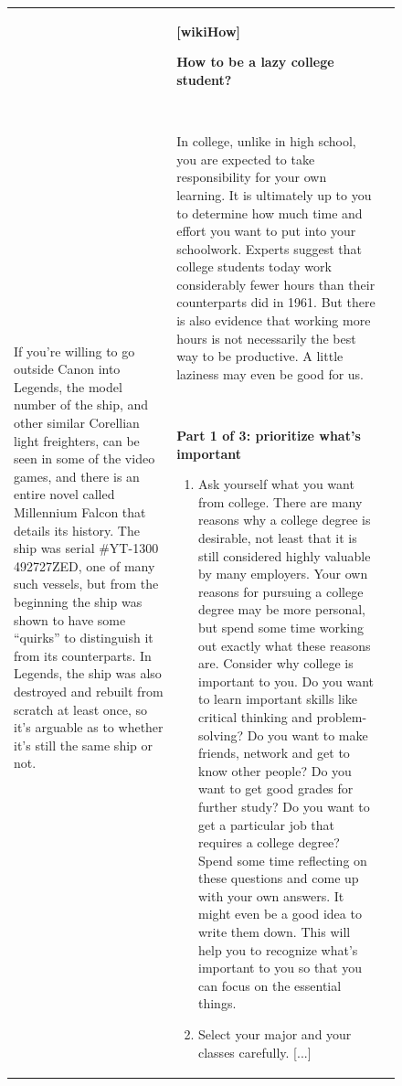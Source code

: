 \begin{figure}[p]
\begin{tabular}{@{}p{}p{}p{}@{}}
    ~
    
    If you're willing to go outside Canon into Legends, the model number of the ship, and other similar Corellian light freighters, can be seen in some of the video games, and there is an entire novel called Millennium Falcon that details its history. The ship was serial \#YT-1300 492727ZED, one of many such vessels, but from the beginning the ship was shown to have some ``quirks'' to distinguish it from its counterparts. In Legends, the ship was also destroyed and rebuilt from scratch at least once, so it's arguable as to whether it's still the same ship or not.
    
    &
    \textbf{[wikiHow]}
    
    \textcolor[HTML]{3078BE}{\textbf{How to be a lazy college student?}}

    ~

    In college, unlike in high school, you are expected to take responsibility for your own learning.  It is ultimately up to you to determine how much time and effort you want to put into your schoolwork. Experts suggest that college students today work considerably fewer hours than their counterparts did in 1961.  But there is also evidence that working more hours is not necessarily the best way to be productive. A little laziness may even be good for us.

    ~
    
    \textbf{Part 1 of 3: prioritize what's important}
    \begin{enumerate}[leftmargin=8pt]
        \item Ask yourself what you want from college. There are many reasons why a college degree is desirable, not least that it is still considered highly valuable by many employers. Your own reasons for pursuing a college degree may be more personal, but spend some time working out exactly what these reasons are. Consider why college is important to you. Do you want to learn important skills like critical thinking and problem-solving? Do you want to make friends, network and get to know other people? Do you want to get good grades for further study? Do you want to get a particular job that requires a college degree? Spend some time reflecting on these questions and come up with your own answers. It might even be a good idea to write them down. This will help you to recognize what's important to you so that you can focus on the essential things.
        \item Select your major and your classes carefully. \textcolor[HTML]{808080}{[...]}
    \end{enumerate}


\end{tabular}
\end{figure}
